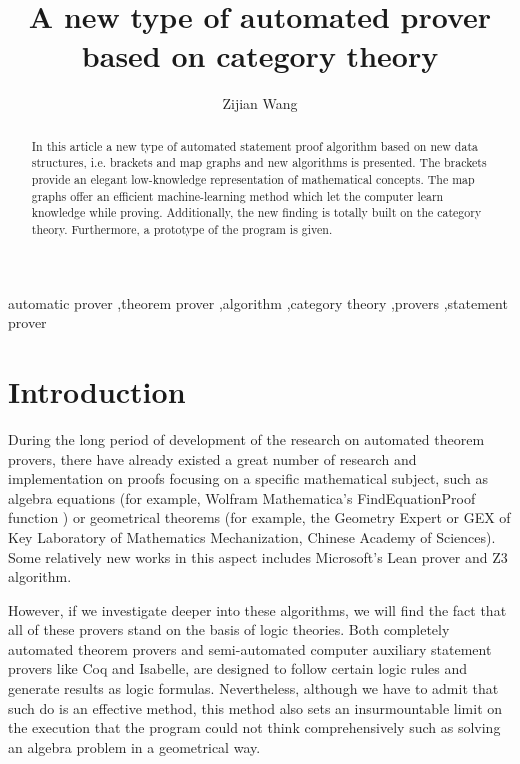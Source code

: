 \documentclass[preprint]{elsarticle}
\numberwithin{theorem}{section}	%
\numberwithin{axiom}{section}	%
\numberwithin{definition}{section}	%
\begin{document}
\title{A new type of automated prover based on category theory}
\author[1]{Zijian Wang}


\maketitle

\begin{abstract}
In this article a new type of automated statement proof algorithm based on new data structures, i.e. brackets and map graphs
and new algorithms is presented. The brackets provide an elegant low-knowledge representation of mathematical concepts. The map graphs offer an efficient machine-learning method which let the computer learn knowledge while proving. Additionally, the new finding is totally built on the category theory. Furthermore, a prototype of the program is given.
\end{abstract}

\begin{keyword}
	automatic prover \sep theorem prover \sep algorithm \sep category theory \sep provers \sep statement prover
\end{keyword}

\section{Introduction}
During the long period of development of the research on automated theorem provers, there have already existed a great number of research and implementation on proofs focusing on a specific mathematical subject, such as algebra equations (for example, Wolfram Mathematica{'}s FindEquationProof function \cite{Wolfram2019}) or geometrical theorems (for example, the Geometry Expert or GEX \cite{Gao1998} of Key Laboratory of Mathematics Mechanization, Chinese Academy of Sciences). Some relatively new works in this aspect includes Microsoft{'}s Lean prover \cite{Moura2021} and Z3 \cite{Moura2008} algorithm.

However, if we investigate deeper into these algorithms, we will find the fact that all of these provers stand on the basis of logic theories. Both completely automated theorem provers and semi-automated computer auxiliary statement provers like Coq and Isabelle, are designed to follow certain logic rules and generate results as logic formulas. Nevertheless, although we have to admit that such do is an effective method, this method also sets an insurmountable limit on the execution that the program could not think comprehensively such as solving an algebra problem in a geometrical way.
\end{document}
